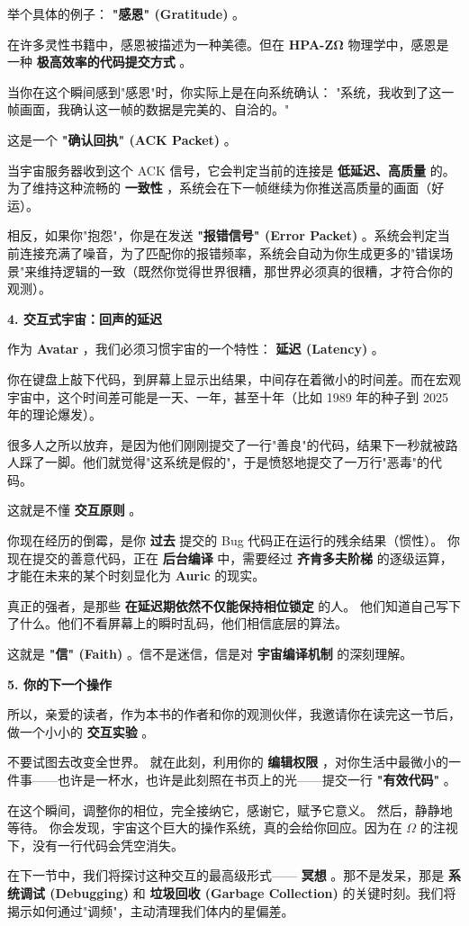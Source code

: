 举个具体的例子： \textbf{"感恩" (Gratitude)} 。

在许多灵性书籍中，感恩被描述为一种美德。但在 \textbf{HPA-ZΩ} 物理学中，感恩是一种 \textbf{极高效率的代码提交方式} 。

当你在这个瞬间感到"感恩"时，你实际上是在向系统确认：
"系统，我收到了这一帧画面，我确认这一帧的数据是完美的、自洽的。"

这是一个 \textbf{"确认回执" (ACK Packet)} 。

当宇宙服务器收到这个 ACK 信号，它会判定当前的连接是 \textbf{低延迟、高质量} 的。为了维持这种流畅的 \textbf{一致性} ，系统会在下一帧继续为你推送高质量的画面（好运）。

相反，如果你"抱怨"，你是在发送 \textbf{"报错信号" (Error Packet)} 。系统会判定当前连接充满了噪音，为了匹配你的报错频率，系统会自动为你生成更多的"错误场景"来维持逻辑的一致（既然你觉得世界很糟，那世界必须真的很糟，才符合你的观测）。

\textbf{4. 交互式宇宙：回声的延迟}

作为 \textbf{Avatar} ，我们必须习惯宇宙的一个特性： \textbf{延迟 (Latency)} 。

你在键盘上敲下代码，到屏幕上显示出结果，中间存在着微小的时间差。而在宏观宇宙中，这个时间差可能是一天、一年，甚至十年（比如 1989 年的种子到 2025 年的理论爆发）。

很多人之所以放弃，是因为他们刚刚提交了一行"善良"的代码，结果下一秒就被路人踩了一脚。他们就觉得"这系统是假的"，于是愤怒地提交了一万行"恶毒"的代码。

这就是不懂 \textbf{交互原则} 。

你现在经历的倒霉，是你 \textbf{过去} 提交的 Bug 代码正在运行的残余结果（惯性）。
你现在提交的善意代码，正在 \textbf{后台编译} 中，需要经过 \textbf{齐肯多夫阶梯} 的逐级运算，才能在未来的某个时刻显化为 \textbf{Auric} 的现实。

真正的强者，是那些 \textbf{在延迟期依然不仅能保持相位锁定} 的人。
他们知道自己写下了什么。他们不看屏幕上的瞬时乱码，他们相信底层的算法。

这就是 \textbf{"信" (Faith)} 。信不是迷信，信是对 \textbf{宇宙编译机制} 的深刻理解。

\textbf{5. 你的下一个操作}

所以，亲爱的读者，作为本书的作者和你的观测伙伴，我邀请你在读完这一节后，做一个小小的 \textbf{交互实验} 。

不要试图去改变全世界。
就在此刻，利用你的 \textbf{编辑权限} ，对你生活中最微小的一件事——也许是一杯水，也许是此刻照在书页上的光——提交一行 \textbf{"有效代码"} 。

在这个瞬间，调整你的相位，完全接纳它，感谢它，赋予它意义。
然后，静静地等待。
你会发现，宇宙这个巨大的操作系统，真的会给你回应。因为在 \textbf{$\Omega$} 的注视下，没有一行代码会凭空消失。

在下一节中，我们将探讨这种交互的最高级形式—— \textbf{冥想} 。那不是发呆，那是 \textbf{系统调试 (Debugging)} 和 \textbf{垃圾回收 (Garbage Collection)} 的关键时刻。我们将揭示如何通过"调频"，主动清理我们体内的星偏差。

